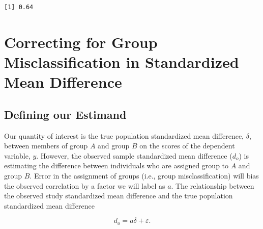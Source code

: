 \documentclass[
  letterpaper,
  DIV=11,
  numbers=noendperiod]{scrreprt}
\newenvironment{Shaded}{\begin{snugshade}}{\end{snugshade}}
\newcommand{\DecValTok}[1]{\textcolor[rgb]{0.68,0.00,0.00}{#1}}
\newcommand{\DocumentationTok}[1]{\textcolor[rgb]{0.37,0.37,0.37}{\textit{#1}}}
\newcommand{\FunctionTok}[1]{\textcolor[rgb]{0.28,0.35,0.67}{#1}}
\newcommand{\NormalTok}[1]{\textcolor[rgb]{0.00,0.23,0.31}{#1}}
\newcommand{\OtherTok}[1]{\textcolor[rgb]{0.00,0.23,0.31}{#1}}
\newcommand{\SpecialCharTok}[1]{\textcolor[rgb]{0.37,0.37,0.37}{#1}}
\begin{document}
\begin{Shaded}
\end{Shaded}

\begin{verbatim}
[1] 0.64
\end{verbatim}

\hypertarget{correcting-for-group-misclassification-in-standardized-mean-difference}{%
\section{Correcting for Group Misclassification in Standardized Mean
Difference}\label{correcting-for-group-misclassification-in-standardized-mean-difference}}

\hypertarget{defining-our-estimand-2}{%
\subsection{Defining our Estimand}\label{defining-our-estimand-2}}

Our quantity of interest is the true population standardized mean
difference, \(\delta\), between members of group \(A\) and group \(B\)
on the scores of the dependent variable, \(y\). However, the observed
sample standardized mean difference (\(d_o\)) is estimating the
difference between individuals who are assigned group to \(A\) and group
\(B\). Error in the assignment of groups (i.e., group misclassification)
will bias the observed correlation by a factor we will label as \(a\).
The relationship between the observed study standardized mean difference
and the true population standardized mean difference

\[
d_o = a\delta + \varepsilon.
\]
\end{document}
